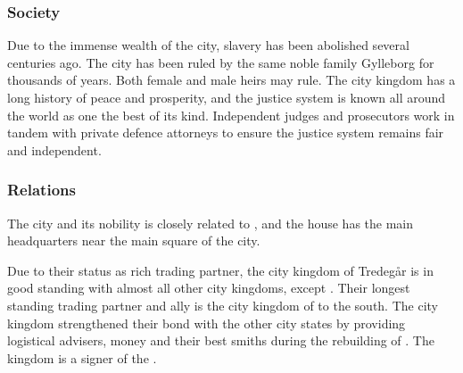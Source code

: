 \subsubsection{Society}

Due to the immense wealth of the city, slavery has been abolished several
centuries ago. The city has been ruled by the same noble family Gylleborg
for thousands of years. Both female and male heirs may rule. The city kingdom
has a long history of peace and prosperity, and the justice system is known
all around the world as one the best of its kind. Independent judges and
prosecutors work in tandem with private defence attorneys to ensure the
justice system remains fair and independent.

\subsubsection{Relations}

The city and its nobility is closely related to ,
and the house has the main headquarters near the main square of the city.

Due to their status as rich trading partner, the city kingdom of Tredegår is
in good standing with almost all other city kingdoms, except
.  Their longest standing trading partner and ally is the
city kingdom of  to the south. The city kingdom
strengthened their bond with the other city states by providing logistical
advisers, money and their best smiths during the rebuilding of
. The kingdom is a signer of the .
